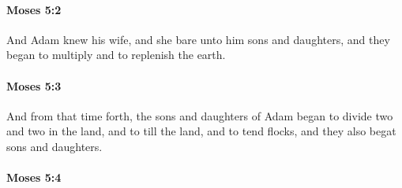 
		\paragraph{Moses 5:2} %
			\label{MOSES-5-2}

			And Adam knew his wife, and she bare unto him sons and daughters, and they began to multiply and to replenish the earth.


		\paragraph{Moses 5:3} %
			\label{MOSES-5-3}

			And from that time forth, the sons and daughters of Adam began to divide two and two in the land, and to till the land, and to tend flocks, and they also begat sons and daughters.


		\paragraph{Moses 5:4} %
			\label{MOSES-5-4}

